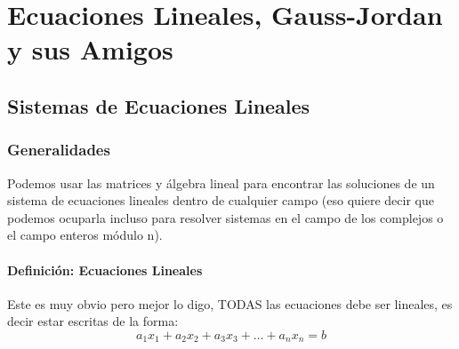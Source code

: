 \documentclass[12pt, fleqn]{report}                             %
\theoremstyle{break}                                            %
\begin{document}
\part{Ecuaciones Lineales, Gauss-Jordan y sus Amigos}
\clearpage



    \chapter{Sistemas de Ecuaciones Lineales}
        \clearpage


        \section{Generalidades}

            Podemos usar las matrices y álgebra lineal para encontrar las soluciones
            de un sistema de ecuaciones lineales dentro de cualquier campo (eso quiere
            decir que podemos ocuparla incluso para resolver sistemas en el campo de
            los complejos o el campo enteros módulo n).

            \subsection{Definición: Ecuaciones Lineales}

                Este es muy obvio pero mejor lo digo, TODAS las ecuaciones debe ser lineales,
                es decir estar escritas de la forma:
                \begin{equation*}
                    a_1x_1 + a_2x_2 + a_3x_3 + \dots + a_nx_n = b
                \end{equation*}
\end{document}
